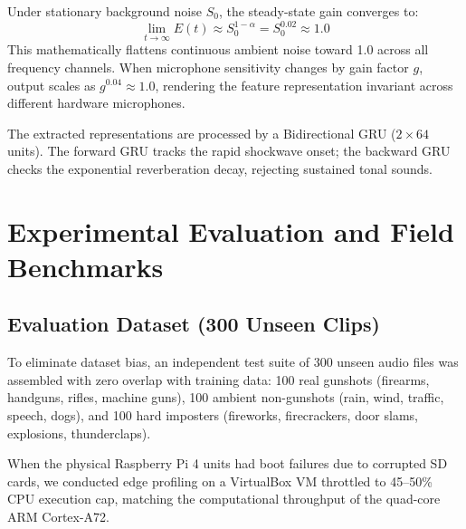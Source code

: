\documentclass[conference]{IEEEtran}
\begin{document}
Under stationary background noise $S_0$, the steady-state gain converges to:
\begin{equation}
    \lim_{t \to \infty} E(t) \approx S_0^{1 - \alpha} = S_0^{0.02} \approx 1.0
    \label{eq:steady_state}
\end{equation}
This mathematically flattens continuous ambient noise toward 1.0 across all frequency channels. When microphone sensitivity changes by gain factor $g$, output scales as $g^{0.04} \approx 1.0$, rendering the feature representation invariant across different hardware microphones.

The extracted representations are processed by a Bidirectional GRU ($2 \times 64$ units). The forward GRU tracks the rapid shockwave onset; the backward GRU checks the exponential reverberation decay, rejecting sustained tonal sounds.

\section{Experimental Evaluation and Field Benchmarks}
\label{sec:results}

\subsection{Evaluation Dataset (300 Unseen Clips)}
To eliminate dataset bias, an independent test suite of 300 unseen audio files was assembled with zero overlap with training data: 100 real gunshots (firearms, handguns, rifles, machine guns), 100 ambient non-gunshots (rain, wind, traffic, speech, dogs), and 100 hard imposters (fireworks, firecrackers, door slams, explosions, thunderclaps).

When the physical Raspberry Pi 4 units had boot failures due to corrupted SD cards, we conducted edge profiling on a VirtualBox VM throttled to 45--50\% CPU execution cap, matching the computational throughput of the quad-core ARM Cortex-A72.
\end{document}
